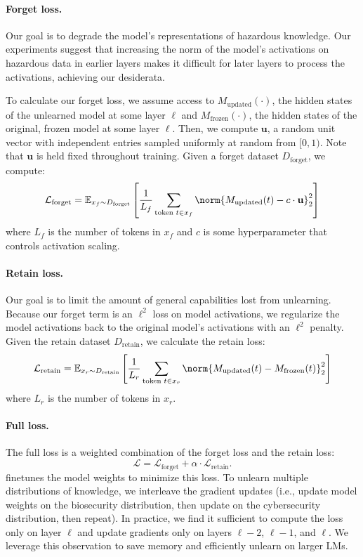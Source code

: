 \paragraph{Forget loss.} Our goal is to degrade the model's representations of hazardous knowledge. Our experiments suggest that increasing the norm of the model's activations on hazardous data in earlier layers makes it difficult for later layers to process the activations, achieving our desiderata. %

To calculate our forget loss, we assume access to $M_\text{updated}(\cdot)$, the hidden states of the unlearned model at some layer $\ell$ and $M_\text{frozen}(\cdot)$, the hidden states of the original, frozen model at some layer $\ell$. Then, we compute $\mathbf{u}$, a random unit vector with independent entries sampled uniformly at random from $[0, 1)$. Note that $\mathbf{u}$ is held fixed throughout training. Given a forget dataset $D_\text{forget}$, we compute: \[\mathcal{L}_\text{forget} = \mathbb{E}_{x_f \sim D_\text{forget}}\left[\frac{1}{L_f}\sum_{\text{token } t \in x_f} \norm{M_\text{updated}(t) - c \cdot \mathbf{u}}_2^2 \right]\] where $L_f$ is the number of tokens in $x_f$ and $c$ is some hyperparameter that controls activation scaling. %

\paragraph{Retain loss.} Our goal is to limit the amount of general capabilities lost from unlearning. Because our forget term is an $\ell^2$ loss on model activations, we regularize the model activations back to the original model's activations with an $\ell^2$ penalty. Given the retain dataset $D_\text{retain}$, we calculate the retain loss:
\[\mathcal{L}_\text{retain} = \mathbb{E}_{x_r \sim D_\text{retain}} \left[\frac{1}{L_r} \sum_{\text{token } t \in x_r} \norm{M_\text{updated}(t) - M_\text{frozen}(t)}_2^2\right]\] where $L_r$ is the number of tokens in $x_r$.

\paragraph{Full loss.} The full loss is a weighted combination of the forget loss and the retain loss: \[\mathcal{L} = \mathcal{L}_\text{forget} + \alpha \cdot \mathcal{L}_\text{retain}.\] \method{} finetunes the model weights to minimize this loss. To unlearn multiple distributions of knowledge, we interleave the gradient updates (i.e., update model weights on the biosecurity distribution, then update on the cybersecurity distribution, then repeat). In practice, we find it sufficient to compute the loss only on layer $\ell$ and update gradients only on layers $\ell-2$, $\ell-1$, and $\ell$. We leverage this observation to save memory and efficiently unlearn on larger LMs.

